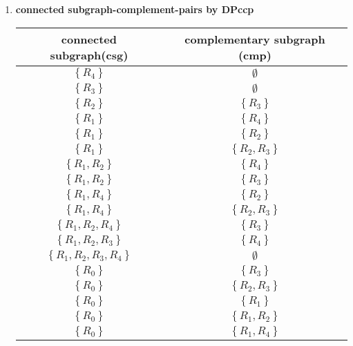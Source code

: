 \documentclass[12pt]{scrartcl}
\begin{document}
\begin{enumerate}
	
	\item \textbf{connected subgraph-complement-pairs by DPccp}
	\begin{table}[H]
		\begin{center}
			\begin{tabular}{cc}
				\hline
				connected subgraph(csg) & complementary subgraph (cmp) \\ \hline
				$\left\lbrace R_{4} \right\rbrace $	& $\emptyset$ \\ \hline
				$\left\lbrace R_{3} \right\rbrace $	& $\emptyset$ \\ \hline
				$\left\lbrace R_{2} \right\rbrace $	& $\left\lbrace R_{3} \right\rbrace $ \\ \hline
				$\left\lbrace R_{1} \right\rbrace $	& $\left\lbrace R_{4} \right\rbrace $ \\
				$\left\lbrace R_{1} \right\rbrace $	& $\left\lbrace R_{2} \right\rbrace $ \\
				$\left\lbrace R_{1} \right\rbrace $	& $\left\lbrace R_{2}, R_{3} \right\rbrace $ \\
				$\left\lbrace R_{1}, R_{2} \right\rbrace $	& $\left\lbrace R_{4} \right\rbrace $ \\
				$\left\lbrace R_{1}, R_{2} \right\rbrace $	& $\left\lbrace R_{3} \right\rbrace $ \\
				$\left\lbrace R_{1}, R_{4} \right\rbrace $	& $\left\lbrace R_{2} \right\rbrace $ \\
				$\left\lbrace R_{1}, R_{4} \right\rbrace $	& $\left\lbrace R_{2}, R_{3} \right\rbrace $ \\
				$\left\lbrace R_{1}, R_{2}, R_{4} \right\rbrace $	& $\left\lbrace R_{3} \right\rbrace $ \\
				$\left\lbrace R_{1}, R_{2}, R_{3} \right\rbrace $	& $\left\lbrace R_{4} \right\rbrace $ \\
				$\left\lbrace R_{1}, R_{2}, R_{3}, R_{4} \right\rbrace $	& $\emptyset $ \\ \hline
				$\left\lbrace R_{0} \right\rbrace $	& $\left\lbrace R_{3} \right\rbrace $ \\
				$\left\lbrace R_{0} \right\rbrace $	& $\left\lbrace R_{2}, R_{3} \right\rbrace $ \\	
				$\left\lbrace R_{0} \right\rbrace $	& $\left\lbrace R_{1} \right\rbrace $ \\
				$\left\lbrace R_{0} \right\rbrace $	& $\left\lbrace R_{1}, R_{2} \right\rbrace $ \\	
				$\left\lbrace R_{0} \right\rbrace $	& $\left\lbrace R_{1}, R_{4} \right\rbrace $ \\	

\end{tabular}
\end{center}
\end{table}
\end{enumerate}
\end{document}
